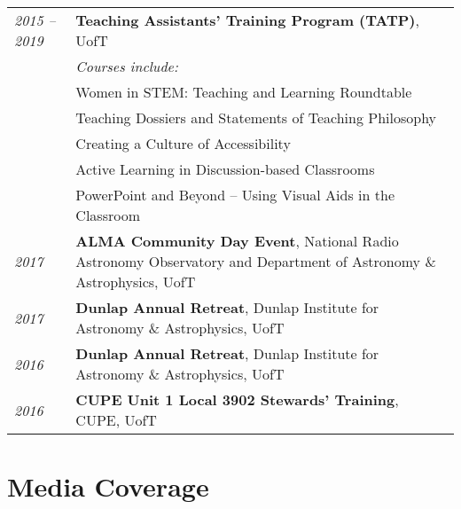 \documentclass[10pt]{res} %
\begin{document}
\begin{resume}
\begin{table}[h!]
\begin{tabularx}{\textwidth}{lX}
\textit{2015 -- 2019}  & \textbf{Teaching Assistants' Training Program (TATP)}, UofT \\
				& \textit{Courses include:} \\
                                  & Women in STEM: Teaching and Learning Roundtable \\
                                  & Teaching Dossiers and Statements of Teaching Philosophy \\
                                  & Creating a Culture of Accessibility \\
                                  & Active Learning in Discussion-based Classrooms \\
                                  & PowerPoint and Beyond -- Using Visual Aids in the Classroom \\
\textit{2017} & \textbf{ALMA Community Day Event}, National Radio Astronomy Observatory and Department of Astronomy \& Astrophysics, UofT \\
\textit{2017} & \textbf{Dunlap Annual Retreat}, Dunlap Institute for Astronomy \& Astrophysics, UofT \\
\textit{2016} & \textbf{Dunlap Annual Retreat}, Dunlap Institute for Astronomy \& Astrophysics, UofT \\
\textit{2016} & \textbf{CUPE Unit 1 Local 3902 Stewards' Training}, CUPE, UofT
\end{tabularx}
\end{table}


\section{\Large Media Coverage}
\vspace{-5pt} %
\noindent\makebox[\linewidth]{\rule{\textwidth}{0.4pt}}
\vspace{-20pt} %


\end{resume}
\end{document}

